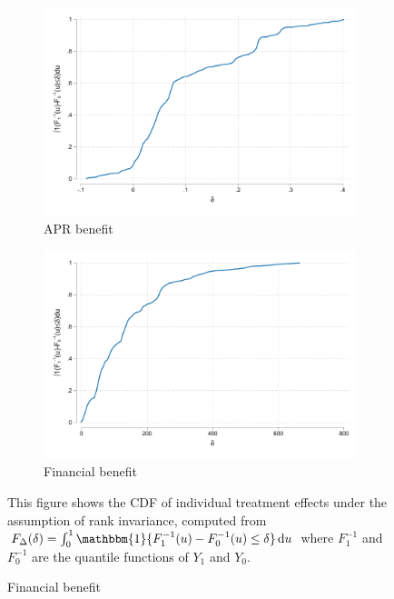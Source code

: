 \begin{appendix}
\begin{figure}[!h]
\caption{Distribution of treatment effects under rank invariance.}        
    \begin{center}
       \begin{subfigure}{0.49\textwidth}
        \caption{APR benefit}
        \centering
        \includegraphics[width=\textwidth]{Figuras/te_rankinvariance_apr.pdf}
    \end{subfigure} 
   \begin{subfigure}{0.49\textwidth}
        \caption{Financial benefit}
        \centering
        \includegraphics[width=\textwidth]{Figuras/te_rankinvariance_fc_admin.pdf}
    \end{subfigure} 
    \end{center}
    \footnotesize{This figure shows the CDF of individual treatment effects under the assumption of rank invariance, computed from $F_\Delta(\delta) = \int_0^1 \mathbbm{1}\{ F_1^{-1}(u) - F_0^{-1}(u)\leq \delta\}\,\mathrm{d}u$ where $F_1^{-1}$ and $F_0^{-1}$ are the quantile functions of $Y_1$ and $Y_0$.}

\end{figure}
\end{appendix}
